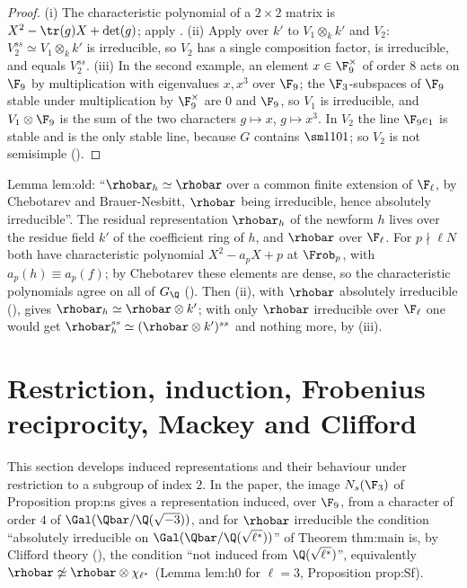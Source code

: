 \begin{proof}
(i) The characteristic polynomial of a $2\times2$ matrix is $X^2-\tr(g)X+\det(g)$; apply .
(ii) Apply  over $k'$ to $V_1\otimes_kk'$ and $V_2$: $V_2^{ss}\simeq V_1\otimes_kk'$ is irreducible, so $V_2$ has a single composition
factor, is irreducible, and equals $V_2^{ss}$.
(iii) In the second example, an element $x\in\F_9^\times$ of order $8$ acts on $\F_9$ by multiplication with eigenvalues $x,x^3$ over $\F_9$; the
$\F_3$-subspaces of $\F_9$ stable under multiplication by $\F_9^\times$ are $0$ and $\F_9$, so $V_1$ is irreducible, and $V_1\otimes\F_9$ is the sum of
the two characters $g\mapsto x$, $g\mapsto x^3$. In $V_2$ the line $\F_9e_1$ is stable and is the only stable line, because $G$ contains $\sm1101$;
so $V_2$ is not semisimple ().
\end{proof}

\begin{paperlink}
Lemma lem:old: ``$\rhobar_h\simeq\rhobar$ over a common finite extension of $\F_\ell$, by Chebotarev and Brauer-Nesbitt, $\rhobar$ being irreducible, hence
absolutely irreducible''. The residual representation $\rhobar_h$ of the newform $h$ lives over the residue field $k'$ of the coefficient
ring of $h$, and $\rhobar$ over $\F_\ell$. For $p\nmid\ell N$ both have characteristic polynomial $X^2-a_pX+p$ at $\Frob_p$, with
$a_p(h)\equiv a_p(f)$; by Chebotarev these elements are dense, so the characteristic polynomials agree on all of $G_\Q$ ().
Then (ii), with $\rhobar$ absolutely irreducible (), gives
$\rhobar_h\simeq\rhobar\otimes k'$; with only $\rhobar$ irreducible over $\F_\ell$ one would get $\rhobar_h^{ss}\simeq(\rhobar\otimes k')^{ss}$ and nothing more, by (iii).
\end{paperlink}

\section[Restriction, induction, Mackey and Clifford]{Restriction, induction, Frobenius reciprocity, Mackey and Clifford}\label{sec:reps:induction}

This section develops induced representations and their behaviour under restriction to a subgroup of index $2$. In the paper,
the image $N_s(\F_3)$ of Proposition prop:ns gives a representation induced, over $\F_9$, from a character of order $4$ of
$\Gal(\Qbar/\Q(\sqrt{-3}))$, and for $\rhobar$ irreducible the condition ``absolutely irreducible on $\Gal(\Qbar/\Q(\sqrt{\ell^*}))$'' of Theorem thm:main
is, by Clifford theory (), the condition ``not induced from $\Q(\sqrt{\ell^*})$'', equivalently $\rhobar\not\simeq\rhobar\otimes\chi_{\ell^*}$
(Lemma lem:h0 for $\ell=3$, Proposition prop:Sf).

